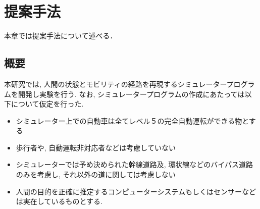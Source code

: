 \chapter{提案手法}
\label{proposed}

本章では提案手法について述べる．

\section{概要}

本研究では, 人間の状態とモビリティの経路を再現するシミュレータープログラムを開発し実験を行う.
なお, シミュレータープログラムの作成にあたっては以下について仮定を行った.

\begin{itemize}
    \item シミュレーター上での自動車は全てレベル５の完全自動運転ができる物とする
    \item 歩行者や, 自動運転非対応者などは考慮していない
    \item シミュレーターでは予め決められた幹線道路及, 環状線などのバイパス道路のみを考慮し, それ以外の道に関しては考慮しない
    \item 人間の目的を正確に推定するコンピューターシステムもしくはセンサーなどは実在しているものとする. 
\end{itemize}


